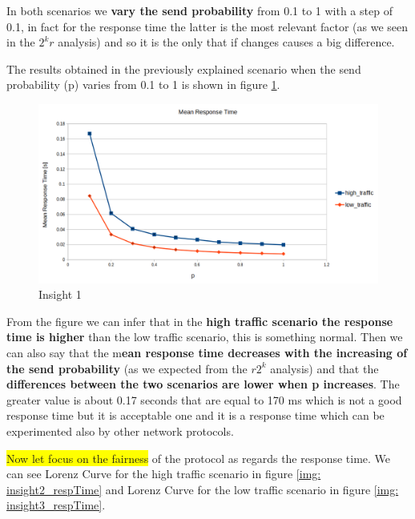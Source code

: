 \noindent In both scenarios we \textbf{vary the send probability} from 0.1 to 1 with a step of 0.1, in fact for the response time the latter is the most relevant factor (as we seen in the $2^kr$ analysis) and so it is the only that if changes causes a big difference.

\noindent The results obtained in the previously explained scenario when the send probability (p) varies from 0.1 to 1 is shown in figure \ref{img: insight1_respTime}.
\begin{figure}[H]
	\centering
	\includegraphics[width=\textwidth]{img/MeanResponseTimeInsight.png}
	\caption{Insight 1}
	\label{img: insight1_respTime}
\end{figure}

\noindent From the figure we can infer that in the \textbf{high traffic scenario the response time is higher} than the low traffic scenario, this is something normal. Then we can also say that the m\textbf{ean response time decreases with the increasing of the send probability} (as we expected from the $r2^k$ analysis) and that the \textbf{differences between the two scenarios are lower when p increases}. The greater value is about 0.17 seconds that are equal to 170 ms which is not a good response time but it is acceptable one and it is a response time which can be experimented also by other network protocols.

\noindent \colorbox{yellow}{Now let focus on the fairness} of the protocol as regards the response time. We can see Lorenz Curve for the high traffic scenario in figure \ref{img: insight2_respTime} and Lorenz Curve for the low traffic scenario in figure \ref{img: insight3_respTime}.


